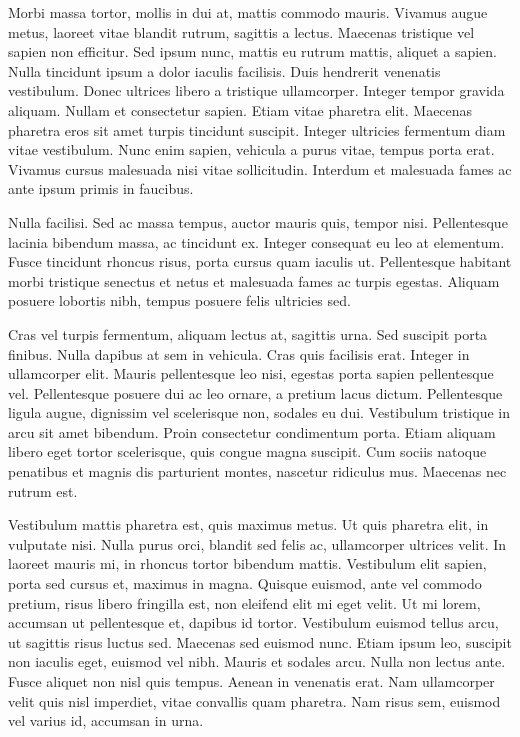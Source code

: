 Morbi massa tortor, mollis in dui at, mattis commodo mauris. Vivamus
augue metus, laoreet vitae blandit rutrum, sagittis a lectus. Maecenas
tristique vel sapien non efficitur. Sed ipsum nunc, mattis eu rutrum
mattis, aliquet a sapien. Nulla tincidunt ipsum a dolor iaculis
facilisis. Duis hendrerit venenatis vestibulum. Donec ultrices libero a
tristique ullamcorper. Integer tempor gravida aliquam. Nullam et
consectetur sapien. Etiam vitae pharetra elit. Maecenas pharetra eros
sit amet turpis tincidunt suscipit. Integer ultricies fermentum diam
vitae vestibulum. Nunc enim sapien, vehicula a purus vitae, tempus porta
erat. Vivamus cursus malesuada nisi vitae sollicitudin. Interdum et
malesuada fames ac ante ipsum primis in faucibus.

Nulla facilisi. Sed ac massa tempus, auctor mauris quis, tempor
nisi. Pellentesque lacinia bibendum massa, ac tincidunt ex. Integer
consequat eu leo at elementum. Fusce tincidunt rhoncus risus, porta
cursus quam iaculis ut. Pellentesque habitant morbi tristique senectus
et netus et malesuada fames ac turpis egestas. Aliquam posuere lobortis
nibh, tempus posuere felis ultricies sed.

Cras vel turpis fermentum, aliquam lectus at, sagittis urna. Sed
suscipit porta finibus. Nulla dapibus at sem in vehicula. Cras quis
facilisis erat. Integer in ullamcorper elit. Mauris pellentesque leo
nisi, egestas porta sapien pellentesque vel. Pellentesque posuere dui ac
leo ornare, a pretium lacus dictum. Pellentesque ligula augue, dignissim
vel scelerisque non, sodales eu dui. Vestibulum tristique in arcu sit
amet bibendum. Proin consectetur condimentum porta. Etiam aliquam libero
eget tortor scelerisque, quis congue magna suscipit. Cum sociis natoque
penatibus et magnis dis parturient montes, nascetur ridiculus
mus. Maecenas nec rutrum est.

Vestibulum mattis pharetra est, quis maximus metus. Ut quis pharetra
elit, in vulputate nisi. Nulla purus orci, blandit sed felis ac,
ullamcorper ultrices velit. In laoreet mauris mi, in rhoncus tortor
bibendum mattis. Vestibulum elit sapien, porta sed cursus et, maximus in
magna. Quisque euismod, ante vel commodo pretium, risus libero fringilla
est, non eleifend elit mi eget velit. Ut mi lorem, accumsan ut
pellentesque et, dapibus id tortor. Vestibulum euismod tellus arcu, ut
sagittis risus luctus sed. Maecenas sed euismod nunc. Etiam ipsum leo,
suscipit non iaculis eget, euismod vel nibh. Mauris et sodales
arcu. Nulla non lectus ante. Fusce aliquet non nisl quis tempus. Aenean
in venenatis erat. Nam ullamcorper velit quis nisl imperdiet, vitae
convallis quam pharetra. Nam risus sem, euismod vel varius id, accumsan
in urna.

